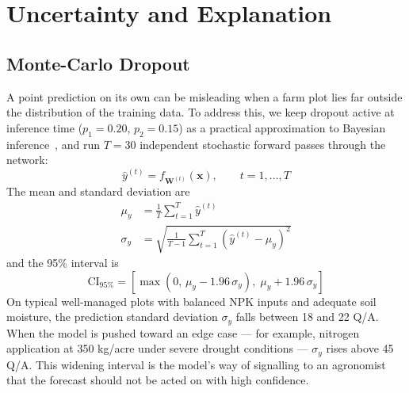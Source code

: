 \documentclass[conference,10pt,letterpaper]{IEEEtran}
\begin{document}
\section{Uncertainty and Explanation}

\subsection{Monte-Carlo Dropout}
A point prediction on its own can be misleading when a farm plot lies far outside the distribution of the training data. To address this, we keep dropout active at inference time ($p_1 = 0.20$, $p_2 = 0.15$) as a practical approximation to Bayesian inference~\cite{gal2016dropout}, and run $T = 30$ independent stochastic forward passes through the network:
\begin{equation}
\hat{y}^{(t)} = f_{\mathbf{W}^{(t)}}(\mathbf{x}), \qquad t = 1, \dots, T
\end{equation}
The mean and standard deviation are
\begin{align}
\mu_y &= \frac{1}{T} \sum_{t=1}^T \hat{y}^{(t)} \\
\sigma_y &= \sqrt{\frac{1}{T - 1} \sum_{t=1}^T \left(\hat{y}^{(t)} - \mu_y\right)^2}
\end{align}
and the 95\% interval is
\begin{equation}
\text{CI}_{95\%} = \left[\max(0,\, \mu_y - 1.96\,\sigma_y),\; \mu_y + 1.96\,\sigma_y\right]
\end{equation}
On typical well-managed plots with balanced NPK inputs and adequate soil moisture, the prediction standard deviation $\sigma_y$ falls between 18 and 22 Q/A. When the model is pushed toward an edge case --- for example, nitrogen application at 350 kg/acre under severe drought conditions --- $\sigma_y$ rises above 45 Q/A. This widening interval is the model's way of signalling to an agronomist that the forecast should not be acted on with high confidence.
\end{document}
